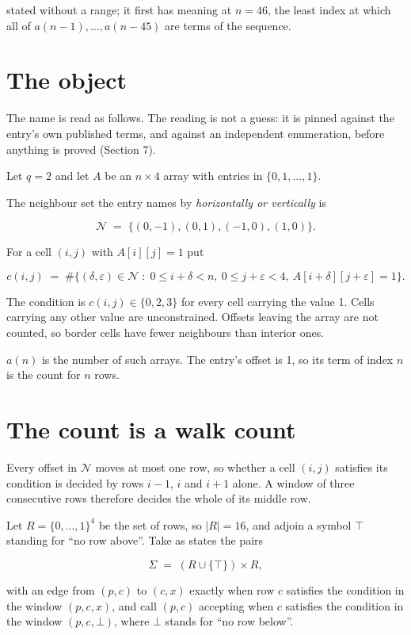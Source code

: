 \documentclass[11pt]{article}
\theoremstyle{definition}
\begin{document}
stated without a range; it first has meaning at $n = 46$, the least index at which all of $a(n-1),\dots,a(n-45)$ are terms of the sequence.

\section{The object}

The name is read as follows. The reading is not a guess: it is pinned against the entry's own published terms, and against an independent enumeration, before anything is proved (Section 7).

Let $q = 2$ and let $A$ be an $n \times 4$ array with entries in $\{0,1,\dots,1\}$.

The neighbour set the entry names by {\itshape horizontally or vertically} is

\[\mathcal{N} \;=\; \{(0,-1), (0,1), (-1,0), (1,0)\}.\]

For a cell $(i,j)$ with $A[i][j] = 1$ put

\[c(i,j) \;=\; \#\bigl\{(\delta,\varepsilon)\in\mathcal{N} \;:\; 0\le i+\delta<n,\ 0\le j+\varepsilon<4,\ A[i+\delta][j+\varepsilon] = 1\bigr\}.\]

The condition is $c(i,j) \in \{0, 2, 3\}$ for every cell carrying the value 1. Cells carrying any other value are unconstrained. Offsets leaving the array are not counted, so border cells have fewer neighbours than interior ones.

$a(n)$ is the number of such arrays. The entry's offset is 1, so its term of index $n$ is the count for $n$ rows.

\section{The count is a walk count}

Every offset in $\mathcal{N}$ moves at most one row, so whether a cell $(i,j)$ satisfies its condition is decided by rows $i-1$, $i$ and $i+1$ alone. A window of three consecutive rows therefore decides the whole of its middle row.

Let $R = \{0,\dots,1\}^{4}$ be the set of rows, so $|R| = 16$, and adjoin a symbol $\top$ standing for ``no row above''. Take as states the pairs

\[\Sigma \;=\; (R \cup \{\top\}) \times R,\]

with an edge from $(p,c)$ to $(c,x)$ exactly when row $c$ satisfies the condition in the window $(p,c,x)$, and call $(p,c)$ accepting when $c$ satisfies the condition in the window $(p,c,\bot)$, where $\bot$ stands for ``no row below''.
\end{document}
